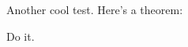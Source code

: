 \documentclass[reqno]{amsart} 
\begin{document}
Another cool test.  Here's a theorem:
\begin{theorem}\label{theorem:35ac204d35}
  Do it.
\end{theorem}

{} 
\end{document}
